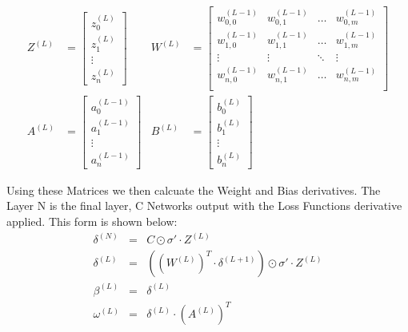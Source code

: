 \begin{flushleft}
                    \begin{align*}
                        Z^{(L)} &=
                        \begin{bmatrix}
                        z^{(L)}_{0} \\
                        z^{(L)}_{1} \\
                        \vdots      \\
                        z^{(L)}_{n} 
                        \end{bmatrix}
                        & W^{(L)} &=
                        \begin{bmatrix}
                        w^{(L-1)}_{0,0} & w^{(L-1)}_{0,1} & \hdots  & w^{(L-1)}_{0,m} \\
                        w^{(L-1)}_{1,0} & w^{(L-1)}_{1,1} & \hdots  & w^{(L-1)}_{1,m} \\
                        \vdots          & \vdots          & \ddots  & \vdots          \\
                        w^{(L-1)}_{n,0} & w^{(L-1)}_{n,1} & \hdots  & w^{(L-1)}_{n,m} \\
                        \end{bmatrix} \\
                        A^{(L)} &=
                        \begin{bmatrix}
                        a^{(L-1)}_{0} \\
                        a^{(L-1)}_{1} \\
                        \vdots      \\
                        a^{(L-1)}_{n} 
                        \end{bmatrix}
                        & B^{(L)} &=
                        \begin{bmatrix}
                        b^{(L)}_{0} \\
                        b^{(L)}_{1} \\
                        \vdots      \\
                        b^{(L)}_{n} 
                        \end{bmatrix}
                    \end{align*}

                    Using these Matrices we then calcuate the Weight and Bias derivatives. The Layer N is the final layer, C Networks output with the 
                    Loss Functions derivative applied. This form is shown below: \\

                    \begin{eqnarray*}
                        \delta^{(N)} &=& C \odot \sigma' \cdot Z^{(L)} \\
                        \delta^{(L)} &=& ((W^{(L)})^T \cdot \delta^{(L+1)}) \odot \sigma' \cdot Z^{(L)} \\
                        \beta^{(L)} &=& \delta^{(L)} \\
                        \omega^{(L)} &=& \delta^{(L)} \cdot (A^{(L)})^T \\
                    \end{eqnarray*}
\end{flushleft}
